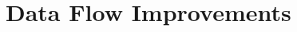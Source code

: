 \documentclass{sdqbeamer}[smallfoot]
\begin{document}
\section{Data Flow Improvements}
\end{document}
